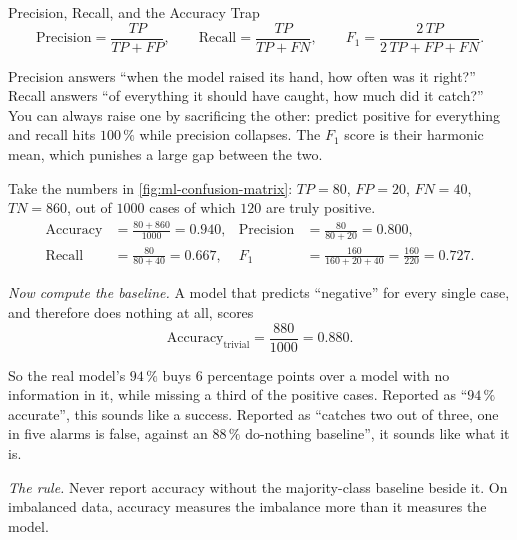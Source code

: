 \begin{v3topic}{Precision, Recall, and the Accuracy Trap}
    \begin{equation}
        \text{Precision} = \frac{TP}{TP+FP},
        \qquad
        \text{Recall} = \frac{TP}{TP+FN},
        \qquad
        F_1 = \frac{2\,TP}{2\,TP+FP+FN}.
        \label{eq:ml-precision-recall}
    \end{equation}

\begin{plainlanguage}
Precision answers ``when the model raised its hand, how often was it right?''
Recall answers ``of everything it should have caught, how much did it catch?''
You can always raise one by sacrificing the other: predict positive for
everything and recall hits $100\,\%$ while precision collapses. The $F_1$ score
is their harmonic mean, which punishes a large gap between the two.
\end{plainlanguage}

\begin{workedexample}
Take the numbers in \cref{fig:ml-confusion-matrix}: $TP=80$, $FP=20$, $FN=40$,
$TN=860$, out of $1000$ cases of which $120$ are truly positive.
\[
\begin{aligned}
  \text{Accuracy} &= \frac{80+860}{1000} = 0.940, &
  \text{Precision} &= \frac{80}{80+20} = 0.800,\\[3pt]
  \text{Recall} &= \frac{80}{80+40} = 0.667, &
  F_1 &= \frac{160}{160+20+40} = \frac{160}{220} = 0.727 .
\end{aligned}
\]

\emph{Now compute the baseline.} A model that predicts ``negative'' for every
single case, and therefore does nothing at all, scores
\[
  \text{Accuracy}_{\text{trivial}} = \frac{880}{1000} = 0.880 .
\]

So the real model's $94\,\%$ buys $6$ percentage points over a model with no
information in it, while missing a third of the positive cases. Reported as
``$94\,\%$ accurate'', this sounds like a success. Reported as ``catches two
out of three, one in five alarms is false, against an $88\,\%$ do-nothing
baseline'', it sounds like what it is.

\emph{The rule.} Never report accuracy without the majority-class baseline
beside it. On imbalanced data, accuracy measures the imbalance more than it
measures the model.
\end{workedexample}


\end{v3topic}
